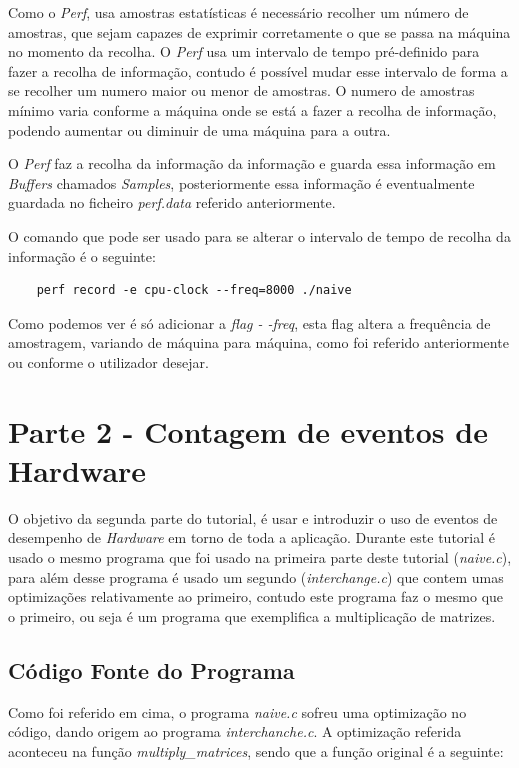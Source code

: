 \documentclass[conference,compsoc]{IEEEtran}
\begin{document}
Como o \textit{Perf}, usa amostras estatísticas é necessário recolher um número de amostras, que sejam capazes de exprimir corretamente o que se passa na máquina no momento da recolha. O \textit{Perf} usa um intervalo de tempo pré-definido para fazer a recolha de informação, contudo é possível mudar esse intervalo de forma a se recolher um numero maior ou menor de amostras. O numero de amostras mínimo varia conforme a máquina onde se está a fazer a recolha de informação, podendo aumentar ou diminuir de uma máquina para a outra.

O \textit{Perf} faz a recolha da informação da informação e guarda essa informação em \textit{Buffers} chamados \textit{Samples}, posteriormente essa informação é eventualmente guardada no ficheiro \textit{perf.data} referido anteriormente.

O comando que pode ser usado para se alterar o intervalo de tempo de recolha da informação é o seguinte:

\begin{lstlisting}
	perf record -e cpu-clock --freq=8000 ./naive
\end{lstlisting}

Como podemos ver é só adicionar a \textit{flag - -freq}, esta flag altera a frequência de amostragem, variando de máquina para máquina, como foi referido anteriormente ou conforme o utilizador desejar. 

\section{Parte 2 - Contagem de eventos de Hardware}

O objetivo da segunda parte do tutorial, é usar e introduzir o uso de eventos de desempenho de \textit{Hardware} em torno de toda a aplicação. Durante este tutorial é usado o mesmo programa que foi usado na primeira parte deste tutorial (\textit{naive.c}), para além desse programa é usado um segundo (\textit{interchange.c}) que contem umas optimizações relativamente ao primeiro, contudo este programa faz o mesmo que o primeiro, ou seja é um programa que exemplifica a multiplicação de matrizes.

\subsection{Código Fonte do Programa}

Como foi referido em cima, o programa \textit{naive.c} sofreu uma optimização no código, dando origem ao programa \textit{interchanche.c}. A optimização referida aconteceu na função \textit{multiply\_matrices}, sendo que a função original é a seguinte:
\end{document}
